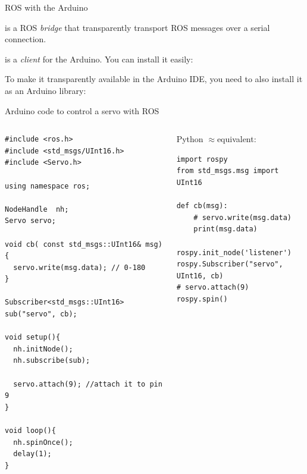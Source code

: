 \documentclass[compress]{beamer}
\begin{document}
\begin{frame}[fragile]{ROS with the Arduino}

     is a ROS \emph{bridge} that transparently transport ROS messages
    over a serial connection.

     is a  \emph{client} for the Arduino.
    You can install it easily:\\

    To make it transparently available in the Arduino IDE, you need to also
    install it as an Arduino library:

\end{frame}


\begin{frame}[fragile]{Arduino code to control a servo with ROS}
\begin{columns}
    \begin{column}{0.5\linewidth}
        
\begin{verbatim}
#include <ros.h>
#include <std_msgs/UInt16.h>
#include <Servo.h> 

using namespace ros;

NodeHandle  nh;
Servo servo;

void cb( const std_msgs::UInt16& msg){
  servo.write(msg.data); // 0-180
}

Subscriber<std_msgs::UInt16> sub("servo", cb);

void setup(){
  nh.initNode();
  nh.subscribe(sub);

  servo.attach(9); //attach it to pin 9
}

void loop(){
  nh.spinOnce();
  delay(1);
}
\end{verbatim}
    \end{column}
    \begin{column}{0.5\linewidth}

        \small Python $\approx$equivalent:

\begin{verbatim}
import rospy
from std_msgs.msg import UInt16

def cb(msg):
    # servo.write(msg.data)
    print(msg.data)

rospy.init_node('listener')
rospy.Subscriber("servo", UInt16, cb)
# servo.attach(9)
rospy.spin()
\end{verbatim}
    \end{column}
\end{columns}
\end{frame}
\end{document}
